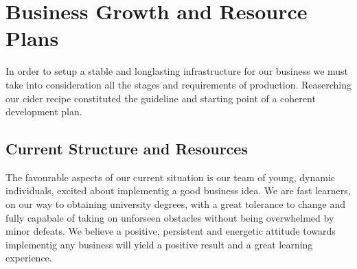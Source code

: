 \documentclass[11pt]{article}
\begin{document}
\newpage
\section{Business Growth and Resource Plans}
In order to setup a stable and longlasting infrastructure for our business we must take into consideration all the stages and requirements of production. Reaserching our cider recipe constituted the guideline and starting point of a coherent development plan.

  \subsection{Current Structure and Resources}
The favourable aspects of our current situation is our team of young, dynamic individuals, excited about implementig a good business idea. We are fast learners, on our way to obtaining university degrees, with a great tolerance to change and fully capabale of taking on unforseen obstacles without being overwhelmed by minor defeats. We believe a positive, persistent and energetic attitude towards implementig any business will yield a positive result and a great learning experience.
\end{document}
